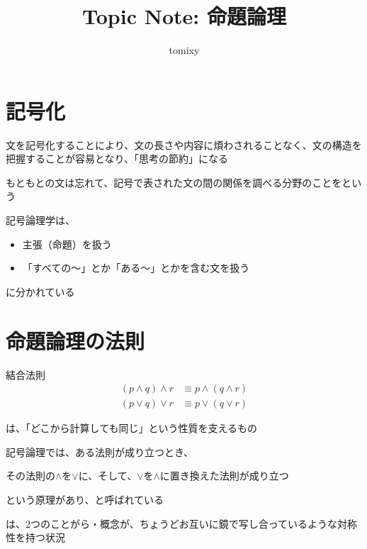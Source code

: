 \documentclass[b5paper,12pt]{jsarticle}
\title{Topic Note: 命題論理}
\author{tomixy}
\begin{document}
\maketitle
\tableofcontents

\sectionline
\section{記号化}

文を記号化することにより、文の長さや内容に煩わされることなく、文の構造を把握することが容易となり、「思考の節約」になる

\br

もともとの文は忘れて、記号で表された文の間の関係を調べる分野のことをという

\br

記号論理学は、
\begin{itemize}
  \item 主張（命題）を扱う
  \item 「すべての〜」とか「ある〜」とかを含む文を扱う
\end{itemize}
に分かれている

\sectionline
\section{命題論理の法則}

\begin{theorem}{結合法則}
  \begin{align*}
    (p \land q) \land r & \equiv p \land (q \land r) \\
    (p \lor q) \lor r   & \equiv p \lor (q \lor r)
  \end{align*}
\end{theorem}

は、「どこから計算しても同じ」という性質を支えるもの

\sectionline

記号論理では、ある法則が成り立つとき、
\begin{shaded}
  その法則の$\land$を$\lor$に、そして、$\lor$を$\land$に置き換えた法則が成り立つ
\end{shaded}
という原理があり、と呼ばれている

\br

\begin{shaded}
  は、2つのことがら・概念が、ちょうどお互いに鏡で写し合っているような対称性を持つ状況
\end{shaded}
\end{document}
